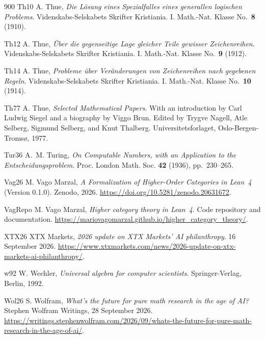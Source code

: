 \begin{thebibliography}{900}
\bibitem%
{Th10} A. Thue, \emph{Die L\"{o}sung eines Spezialfalles eines generallen logischen Problems}. Videnskabs-Selskabets Skrifter Kristiania. I. Math.-Nat. Klasse 
No.~\textbf{8} (1910).

\bibitem%
{Th12} A. Thue, \emph{\"{U}ber die gegenseitige Lage gleicher Teile gewisser Zeichenreihen}. Videnskabs-Selskabets Skrifter Kristiania. I. Math.-Nat. Klasse 
No.~\textbf{9} (1912).

\bibitem%
{Th14} A. Thue, \emph{Probleme \"{u}ber Ver\"{a}nderungen von Zeichenreihen nach gegebenen Regeln}. Videnskabs-Selskabets Skrifter Kristiania. I. Math.-Nat. Klasse No.~\textbf{10} (1914).

\bibitem%
{Th77} A. Thue, \emph{Selected Mathematical Papers}. With an introduction by Carl Ludwig Siegel and a biography by Viggo Brun. Edited by Trygve Nagell, Atle Selberg, Sigmund Selberg, and Knut Thalberg. Universitetsforlaget, Oslo-Bergen-Troms\o, 1977.

\bibitem%
{Tur36} A.~M. Turing, \emph{On Computable Numbers, with an Application to the Entscheidungsproblem}. Proc. London Math. Soc. \textbf{42} (1936), pp.~230--265.

\bibitem%
{Vag26} M. Vago Marzal, \emph{A Formalization of Higher-Order Categories in Lean~4} (Version 0.1.0). Zenodo, 2026. \url{https://doi.org/10.5281/zenodo.20631672}.

\bibitem%
{VagRepo} M. Vago Marzal, \emph{Higher category theory in Lean~4}. Code repository and documentation. \url{https://mariovagomarzal.github.io/higher_category_theory/}.



\bibitem%
{XTX26} XTX Markets, \emph{2026 update on XTX Markets' AI philanthropy}. 16 September 2026. \url{https://www.xtxmarkets.com/news/2026-update-on-xtx-markets-ai-philanthropy/}.

\bibitem%
{w92} W. Wechler, \emph{Universal algebra for computer scientists}. Springer-Verlag, Berlin, 1992.

\bibitem%
{Wol26} S. Wolfram, \emph{What's the future for pure math research in the age of AI?} Stephen Wolfram Writings, 28 September 2026. \url{https://writings.stephenwolfram.com/2026/09/whats-the-future-for-pure-math-research-in-the-age-of-ai/}.


\end{thebibliography}
